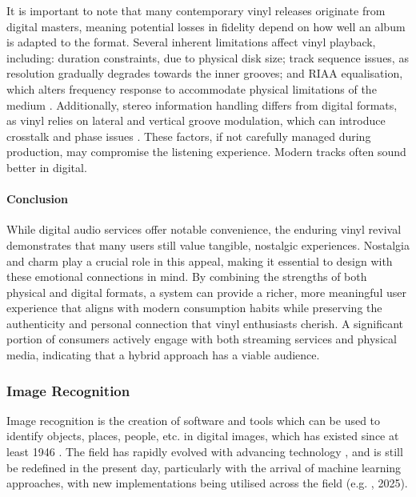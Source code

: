                 It is important to note that many contemporary vinyl releases originate from digital masters, meaning potential losses in fidelity depend on how well an album is adapted to the format. Several inherent limitations affect vinyl playback, including: duration constraints, due to physical disk size; track sequence issues, as resolution gradually degrades towards the inner grooves; and RIAA equalisation, which alters frequency response to accommodate physical limitations of the medium \cite{engineeringvinyls}. Additionally, stereo information handling differs from digital formats, as vinyl relies on lateral and vertical groove modulation, which can introduce crosstalk and phase issues \cite{engineeringvinyls}. These factors, if not carefully managed during production, may compromise the listening experience. Modern tracks often sound better in digital.
    
            \paragraph{Conclusion}
                While digital audio services offer notable convenience, the enduring vinyl revival demonstrates that many users still value tangible, nostalgic experiences. Nostalgia and charm play a crucial role in this appeal, making it essential to design with these emotional connections in mind. By combining the strengths of both physical and digital formats, a system can provide a richer, more meaningful user experience that aligns with modern consumption habits while preserving the authenticity and personal connection that vinyl enthusiasts cherish. A significant portion of consumers actively engage with both streaming services and physical media, indicating that a hybrid approach has a viable audience.
    
        \subsubsection{Image Recognition}
    
    
            Image recognition is the creation of software and tools which can be used to identify objects, places, people, etc. in digital images, which has existed since at least 1946 \cite{hall1979computer}. The field has rapidly evolved with advancing technology \cite{imagenetclasscnn}, and is still be redefined in the present day, particularly with the arrival of machine learning approaches, with new implementations being utilised across the field (e.g. \cite{RAMPRASAD2025100556}, 2025).
    

